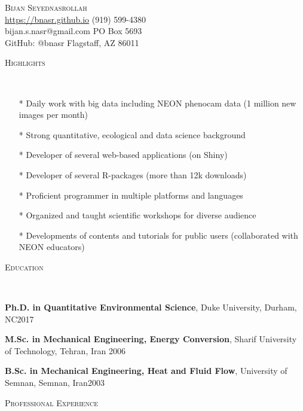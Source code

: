 \documentclass[10pt]{article}
\makeatletter
\newenvironment{changemargin}[2]{%
  \begin{list}{}{%
 \setlength{\topsep}{0pt}%
 \setlength{\leftmargin}{#1}%
 \setlength{\rightmargin}{#2}%
 \setlength{\listparindent}{\parindent}%
 \setlength{\itemindent}{\parindent}%
 \setlength{\parsep}{\parskip}%
  }%
  \item[]}{\end{list}
}
\newcommand{\lineover}{
  \begin{changemargin}{-0.05in}{-0.05in}
  \vspace*{-8pt}
  \hrulefill \\
  \vspace*{-2pt}
  \end{changemargin}
}
\newcommand{\header}[1]{
  \begin{changemargin}{-0.5in}{-0.5in}
  \scshape{#1}\\
  \lineover
  \end{changemargin}
}
\newcommand{\contact}[7]{
  \begin{changemargin}{-0.5in}{-0.5in}
  \begin{flushleft}
  
  {\huge \scshape {#1}}\\ 
  
  \smallskip
  \url{#2} \hfill{#5}\\
  {#3} \hfill{#6}\\
  GitHub: @{#4} \hfill{#7}\\
  
  \end{flushleft}
  \end{changemargin}
}
\newenvironment{body} {
  \vspace*{-2pt}
  \begin{changemargin}{-0.5in}{-0.5in}
}
{\end{changemargin}
}
\makeatother
\begin{document}
\contact{Bijan Seyednasrollah}
{https://bnasr.github.io}
{bijan.s.nasr@gmail.com}
{bnasr}
{(919) 599-4380}
{PO Box 5693}
{Flagstaff, AZ 86011}

\smallskip

\header{Highlights}
\begin{body}
	\vspace*{4pt}
	\begin{itemize} \itemsep -2pt  %
    \item[*]Daily work with big data including NEON phenocam data (1 million new images per month)
    \item[*]Strong quantitative, ecological and data science background
    \item[*]Developer of several web-based applications (on Shiny)
    \item[*]Developer of several R-packages (more than 12k downloads)
    \item[*]Proficient programmer in multiple platforms and languages
    \item[*]Organized and taught scientific workshops for diverse audience
    \item[*]Developments of contents and tutorials for public users (collaborated with NEON educators)
	\end{itemize} 
\end{body}
\smallskip


\header{Education}

\begin{body}
  \textbf{Ph.D. in Quantitative Environmental Science}, Duke University, Durham, NC\hfill {2017} \\
  \smallskip

  \textbf{M.Sc. in Mechanical Engineering, Energy Conversion}, Sharif University of Technology, Tehran, Iran \hfill {2006} \\
  \smallskip

  \textbf{B.Sc. in Mechanical Engineering, Heat and Fluid Flow}, University of Semnan, Semnan, Iran\hfill {2003} \\

\end{body}

\smallskip

\header{Professional Experience}
\end{document}
